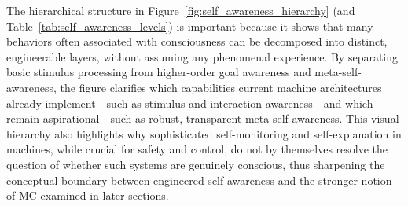 The hierarchical structure in Figure~\ref{fig:self_awareness_hierarchy} (and Table~\ref{tab:self_awareness_levels}) is important because it shows that many behaviors often associated with consciousness can be decomposed into distinct, engineerable layers, without assuming any phenomenal experience. By separating basic stimulus processing from higher-order goal awareness and meta-self-awareness, the figure clarifies which capabilities current machine architectures already implement---such as stimulus and interaction awareness---and which remain aspirational---such as robust, transparent meta-self-awareness. This visual hierarchy also highlights why sophisticated self-monitoring and self-explanation in machines, while crucial for safety and control, do not by themselves resolve the question of whether such systems are genuinely conscious, thus sharpening the conceptual boundary between engineered self-awareness and the stronger notion of MC examined in later sections.

